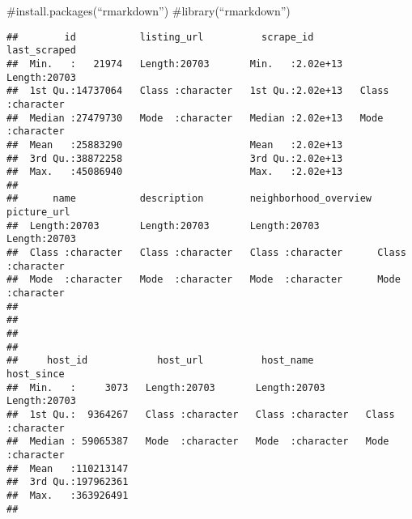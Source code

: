 \#install.packages(``rmarkdown'') \#library(``rmarkdown'')

\begin{Shaded}
\begin{Highlighting}[]
\StringTok{ }\NormalTok{(}\NormalTok{(}\NormalTok{))}

\end{Highlighting}
\end{Shaded}

\begin{verbatim}
##        id           listing_url          scrape_id        last_scraped      
##  Min.   :   21974   Length:20703       Min.   :2.02e+13   Length:20703      
##  1st Qu.:14737064   Class :character   1st Qu.:2.02e+13   Class :character  
##  Median :27479730   Mode  :character   Median :2.02e+13   Mode  :character  
##  Mean   :25883290                      Mean   :2.02e+13                     
##  3rd Qu.:38872258                      3rd Qu.:2.02e+13                     
##  Max.   :45086940                      Max.   :2.02e+13                     
##                                                                             
##      name           description        neighborhood_overview picture_url       
##  Length:20703       Length:20703       Length:20703          Length:20703      
##  Class :character   Class :character   Class :character      Class :character  
##  Mode  :character   Mode  :character   Mode  :character      Mode  :character  
##                                                                                
##                                                                                
##                                                                                
##                                                                                
##     host_id            host_url          host_name          host_since       
##  Min.   :     3073   Length:20703       Length:20703       Length:20703      
##  1st Qu.:  9364267   Class :character   Class :character   Class :character  
##  Median : 59065387   Mode  :character   Mode  :character   Mode  :character  
##  Mean   :110213147                                                           
##  3rd Qu.:197962361                                                           
##  Max.   :363926491                                                           
##                                                                              

\end{verbatim}
